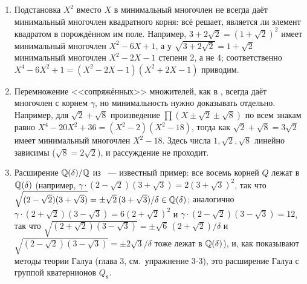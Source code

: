 \begin{remark}[1.32d]
\begin{enumerate}[label=(\alph*),leftmargin=*]
\item Подстановка $X^2$ вместо $X$ в минимальный многочлен не всегда даёт минимальный многочлен квадратного корня: всё
решает, является ли элемент квадратом в порождённом им поле. Например, $3+2\sqrt2=(1+\sqrt2)^2$ имеет минимальный многочлен
$X^2-6X+1$, а у $\sqrt{3+2\sqrt2}=1+\sqrt2$ минимальный многочлен $X^2-2X-1$ степени $2$, а не $4$; соответственно
$X^4-6X^2+1=(X^2-2X-1)(X^2+2X-1)$ приводим.
\item Перемножение <<сопряжённых>> множителей, как в , всегда даёт многочлен с корнем $\gamma$, но
минимальность нужно доказывать отдельно. Например, для $\sqrt2+\sqrt8$ произведение
$\prod(X\pm\sqrt2\pm\sqrt8)$ по всем знакам равно $X^4-20X^2+36=(X^2-2)(X^2-18)$, тогда как $\sqrt2+\sqrt8=3\sqrt2$ имеет
минимальный многочлен $X^2-18$. Здесь числа $1,\sqrt2,\sqrt8$ линейно зависимы ($\sqrt8=2\sqrt2$), и рассуждение
 не проходит.
\item Расширение $\mathbb Q(\delta)/\mathbb Q$ из ~--- известный пример: все восемь корней $Q$ лежат в $\mathbb Q(\delta)$ (например,
$\gamma\cdot(2-\sqrt2)(3+\sqrt3)=2(3+\sqrt3)^2$, так что $\sqrt{(2-\sqrt2)(3+\sqrt3)}=\pm\sqrt2\,(3+\sqrt3)/\delta\in\mathbb Q(\delta)$;
аналогично $\gamma\cdot(2+\sqrt2)(3-\sqrt3)=6(2+\sqrt2)^2$ и $\gamma\cdot(2-\sqrt2)(3-\sqrt3)=12$, так что
$\sqrt{(2+\sqrt2)(3-\sqrt3)}=\pm\sqrt6\,(2+\sqrt2)/\delta$ и $\sqrt{(2-\sqrt2)(3-\sqrt3)}=\pm2\sqrt3/\delta$ тоже лежат в
$\mathbb Q(\delta)$), и, как показывают методы теории Галуа (глава 3, см.\ упражнение 3-3), это расширение Галуа с группой
кватернионов $Q_8$.
\end{enumerate}
\end{remark}
